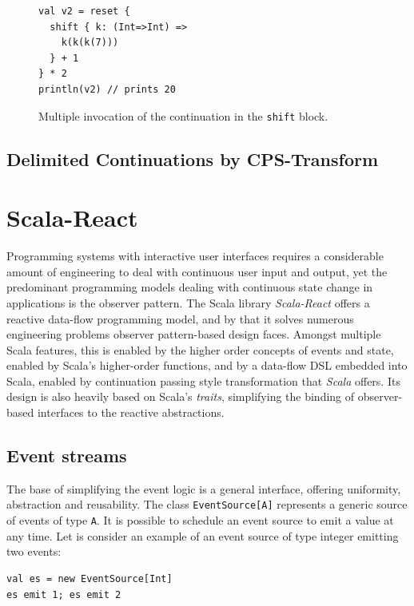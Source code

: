 \begin{figure}[h!] \label{fig:example_cps_2}
\begin{lstlisting}
val v2 = reset {
  shift { k: (Int=>Int) =>
    k(k(k(7)))
  } + 1
} * 2
println(v2) // prints 20
\end{lstlisting}
\caption{Multiple invocation of the continuation in the \texttt{shift} block.}
\end{figure}




\subsection{Delimited Continuations by CPS-Transform}

\section{Scala-React}\label{sec:scala-react}

Programming systems with interactive user interfaces requires a considerable amount of engineering to deal with continuous user input and output, yet the predominant programming models dealing with continuous state change in applications is the observer pattern. The Scala library \emph{Scala-React} offers a reactive data-flow programming model, and by that it solves numerous engineering problems observer pattern-based design faces. Amongst multiple Scala features, this is enabled by the higher order concepts of events and state, enabled by Scala's higher-order functions, and by a data-flow DSL embedded into Scala, enabled by continuation passing style transformation that \emph{Scala} offers. Its design is also heavily based on Scala's \emph{traits}, simplifying the binding of observer-based interfaces to the reactive abstractions.\cite{DeprecatingObservers}

\subsection{Event streams}

The base of simplifying the event logic is a general interface, offering uniformity, abstraction and reusability. The class {\tt EventSource[A]} represents a generic source of events of type {\tt A}. It is possible to schedule an event source to emit a value at any time. Let is consider an example of an event source of type integer emitting two events:
\begin{lstlisting}
val es = new EventSource[Int]
es emit 1; es emit 2
\end{lstlisting}

